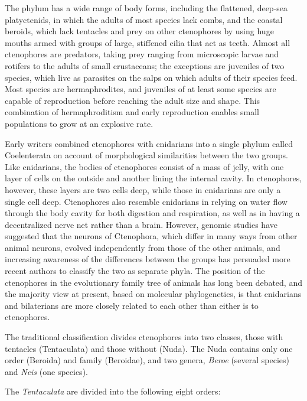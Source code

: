 \documentclass[]{book}
\theoremstyle{definition}
\theoremstyle{definition}
\theoremstyle{definition}
\theoremstyle{remark}
\begin{document}
The phylum has a wide range of body forms, including the flattened,
deep-sea platyctenids, in which the adults of most species lack combs,
and the coastal beroids, which lack tentacles and prey on other
ctenophores by using huge mouths armed with groups of large, stiffened
cilia that act as teeth. Almost all ctenophores are predators, taking
prey ranging from microscopic larvae and rotifers to the adults of small
crustaceans; the exceptions are juveniles of two species, which live as
parasites on the salps on which adults of their species feed. Most
species are hermaphrodites, and juveniles of at least some species are
capable of reproduction before reaching the adult size and shape. This
combination of hermaphroditism and early reproduction enables small
populations to grow at an explosive rate.

Early writers combined ctenophores with cnidarians into a single phylum
called Coelenterata on account of morphological similarities between the
two groups. Like cnidarians, the bodies of ctenophores consist of a mass
of jelly, with one layer of cells on the outside and another lining the
internal cavity. In ctenophores, however, these layers are two cells
deep, while those in cnidarians are only a single cell deep. Ctenophores
also resemble cnidarians in relying on water flow through the body
cavity for both digestion and respiration, as well as in having a
decentralized nerve net rather than a brain. However, genomic studies
have suggested that the neurons of Ctenophora, which differ in many ways
from other animal neurons, evolved independently from those of the other
animals, and increasing awareness of the differences between the groups
has persuaded more recent authors to classify the two as separate phyla.
The position of the ctenophores in the evolutionary family tree of
animals has long been debated, and the majority view at present, based
on molecular phylogenetics, is that cnidarians and bilaterians are more
closely related to each other than either is to ctenophores.

The traditional classification divides ctenophores into two classes,
those with tentacles (Tentaculata) and those without (Nuda). The Nuda
contains only one order (Beroida) and family (Beroidae), and two genera,
\emph{Beroe} (several species) and \emph{Neis} (one species).

The \emph{Tentaculata} are divided into the following eight orders:
\end{document}
